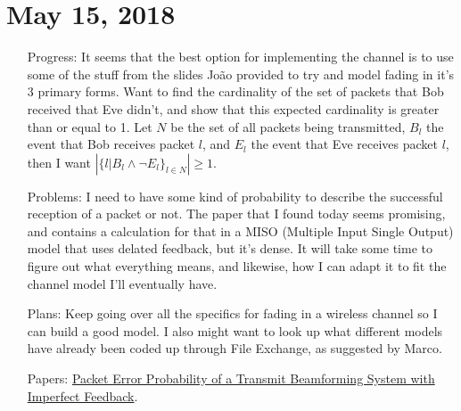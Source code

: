 \documentclass[11pt]{article}
\begin{document}
\section{May 15, 2018}
\begin{itemize}
\item[Progress:]
It seems that the best option for implementing the channel is to use some of the stuff from the slides Jo\~ao provided to try and model fading in it's 3 primary forms.\newline
Want to find the cardinality of the set of packets that Bob received that Eve didn't, and show that this expected cardinality is greater than or equal to 1.  Let $N$ be the set of all packets being transmitted, $B_{l}$ the event that Bob receives packet $l$, and $E_{l}$ the event that Eve receives packet $l$, then I want $\left|\{l | B_{l} \land \lnot E_{l}\}_{l \in N}\right| \geq 1$.

\item[Problems:]
I need to have some kind of probability to describe the successful reception of a packet or not.  The paper that I found today seems promising, and contains a calculation for that in a MISO (Multiple Input Single Output) model that uses delated feedback, but it's dense.  It will take some time to figure out what everything means, and likewise, how I can adapt it to fit the channel model I'll eventually have.

\item[Plans:]
Keep going over all the specifics for fading in a wireless channel so I can build a good model.  I also might want to look up what different models have already been coded up through File Exchange, as suggested by Marco.

\item[Papers:]
\href{https://www.ece.ucsb.edu/~yoga/tsp.pdf}{Packet Error Probability of a Transmit Beamforming System with Imperfect Feedback}.

\end{itemize}
\end{document}
